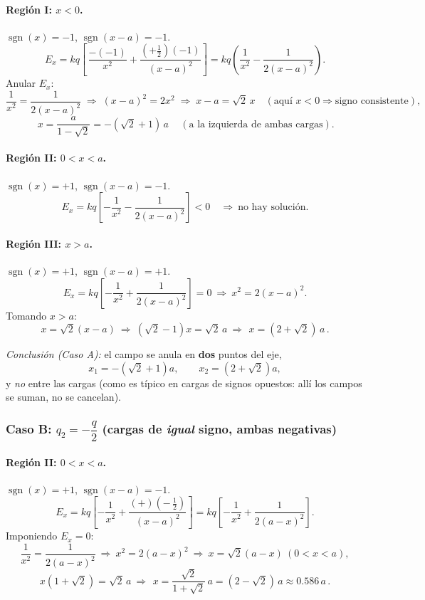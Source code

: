\documentclass{article}
\begin{document}
\paragraph{Región I: $x<0$.} $\operatorname{sgn}(x)= -1$, $\operatorname{sgn}(x-a)=-1$.
\[
E_x=kq\left[\,\frac{-(-1)}{x^2}+\frac{(+\tfrac12)(-1)}{(x-a)^2}\right]
= kq\left(\frac{1}{x^2}-\frac{1}{2(x-a)^2}\right).
\]
Anular $E_x$:
\[
\frac{1}{x^2}=\frac{1}{2(x-a)^2}
\;\Longrightarrow\;
(x-a)^2=2x^2
\;\Longrightarrow\;
x-a=\sqrt{2}\,x\quad(\text{aquí }x<0\Rightarrow\text{signo consistente}),
\]
\[
\boxed{\,x=\frac{a}{1-\sqrt{2}}=-(\sqrt{2}+1)\,a\,}\quad(\text{a la izquierda de ambas cargas}).
\]

\paragraph{Región II: $0<x<a$.} $\operatorname{sgn}(x)=+1$, $\operatorname{sgn}(x-a)=-1$.
\[
E_x=kq\left[-\frac{1}{x^2}-\frac{1}{2(x-a)^2}\right]<0\quad\Rightarrow\ \text{no hay solución}.
\]

\paragraph{Región III: $x>a$.} $\operatorname{sgn}(x)=+1$, $\operatorname{sgn}(x-a)=+1$.
\[
E_x=kq\left[-\frac{1}{x^2}+\frac{1}{2(x-a)^2}\right]=0
\ \Longrightarrow\
x^2=2(x-a)^2.
\]
Tomando $x> a$:
\[
x=\sqrt{2}(x-a)\ \Rightarrow\ (\sqrt{2}-1)x=\sqrt{2}\,a
\ \Rightarrow\
\boxed{\,x=(2+\sqrt{2})\,a\,}.
\]

\emph{Conclusión (Caso A):} el campo se anula en \textbf{dos} puntos del eje,
\[
x_1=-(\sqrt{2}+1)a,\qquad x_2=(2+\sqrt{2})a,
\]
y \emph{no} entre las cargas (como es típico en cargas de signos opuestos: allí los campos se suman, no se cancelan).

\subsubsection*{Caso B: $q_2=-\dfrac{q}{2}$ (cargas de \emph{igual} signo, ambas negativas)}
\paragraph{Región II: $0<x<a$.} $\operatorname{sgn}(x)=+1$, $\operatorname{sgn}(x-a)=-1$.
\[
E_x=kq\left[-\frac{1}{x^2}+\frac{(+)(-\,\tfrac12)}{(x-a)^2}\right]
= kq\left[-\frac{1}{x^2}+\frac{1}{2(a-x)^2}\right].
\]
Imponiendo $E_x=0$:
\[
\frac{1}{x^2}=\frac{1}{2(a-x)^2}\ \Rightarrow\ x^2=2(a-x)^2
\ \Rightarrow\ x=\sqrt{2}(a-x)\ (0<x<a),
\]
\[
x(1+\sqrt{2})=\sqrt{2}\,a\ \Rightarrow\ 
\boxed{\,x=\frac{\sqrt{2}}{1+\sqrt{2}}\,a=(2-\sqrt{2})\,a\approx 0.586\,a\,}.
\]
\end{document}

